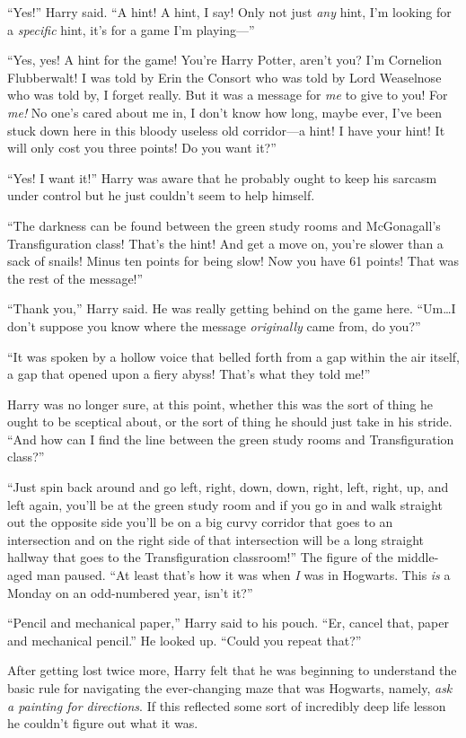 “Yes!” Harry said. “A hint! A hint, I say! Only not just \emph{any} hint, I’m looking for a \emph{specific} hint, it’s for a game I’m playing—”

“Yes, yes! A hint for the game! You’re Harry Potter, aren’t you? I’m Cornelion Flubberwalt! I was told by Erin the Consort who was told by Lord Weaselnose who was told by, I forget really. But it was a message for \emph{me} to give to you! For \emph{me!} No one’s cared about me in, I don’t know how long, maybe ever, I’ve been stuck down here in this bloody useless old corridor—a hint! I have your hint! It will only cost you three points! Do you want it?”

“Yes! I want it!” Harry was aware that he probably ought to keep his sarcasm under control but he just couldn’t seem to help himself.

“The darkness can be found between the green study rooms and McGonagall’s Transfiguration class! That’s the hint! And get a move on, you’re slower than a sack of snails! Minus ten points for being slow! Now you have 61 points! That was the rest of the message!”

“Thank you,” Harry said. He was really getting behind on the game here. “Um…I don’t suppose you know where the message \emph{originally} came from, do you?”

“It was spoken by a hollow voice that belled forth from a gap within the air itself, a gap that opened upon a fiery abyss! That’s what they told me!”

Harry was no longer sure, at this point, whether this was the sort of thing he ought to be sceptical about, or the sort of thing he should just take in his stride. “And how can I find the line between the green study rooms and Transfiguration class?”

“Just spin back around and go left, right, down, down, right, left, right, up, and left again, you’ll be at the green study room and if you go in and walk straight out the opposite side you’ll be on a big curvy corridor that goes to an intersection and on the right side of that intersection will be a long straight hallway that goes to the Transfiguration classroom!” The figure of the middle-aged man paused. “At least that’s how it was when \emph{I} was in Hogwarts. This \emph{is} a Monday on an odd-numbered year, isn’t it?”

“Pencil and mechanical paper,” Harry said to his pouch. “Er, cancel that, paper and mechanical pencil.” He looked up. “Could you repeat that?”

After getting lost twice more, Harry felt that he was beginning to understand the basic rule for navigating the ever-changing maze that was Hogwarts, namely, \emph{ask a painting for directions}. If this reflected some sort of incredibly deep life lesson he couldn’t figure out what it was.

